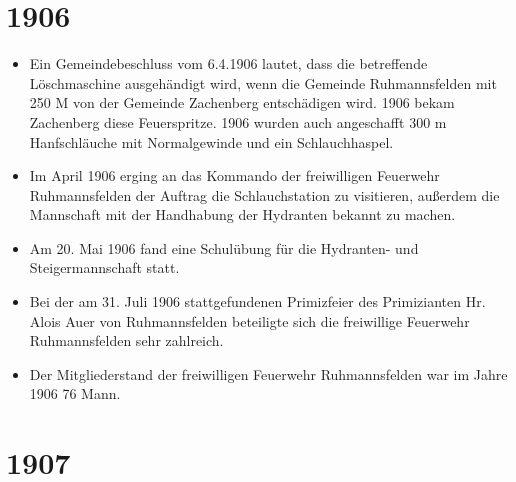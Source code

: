 \documentclass[12pt,a4paper]{book}
\begin{document}
\section*{1906}

\begin{itemize}
\item Ein Gemeindebeschluss vom 6.4.1906 lautet, dass die betreffende
Löschmaschine ausgehändigt wird, wenn die Gemeinde Ruhmannsfelden mit 250 M von
der Gemeinde Zachenberg entschädigen wird. 1906 bekam Zachenberg diese
Feuerspritze. 1906 wurden auch angeschafft 300 m Hanfschläuche mit Normalgewinde
und ein Schlauchhaspel.

\item Im April 1906 erging an das Kommando der freiwilligen Feuerwehr
Ruhmannsfelden der Auftrag die Schlauchstation zu visitieren, außerdem die
Mannschaft mit der Handhabung der Hydranten bekannt zu machen.

\item Am 20. Mai 1906 fand eine Schulübung für die Hydranten- und
Steigermannschaft statt.

\item Bei der am 31. Juli 1906 stattgefundenen Primizfeier des Primizianten Hr.
Alois Auer von Ruhmannsfelden beteiligte sich die freiwillige Feuerwehr
Ruhmannsfelden sehr zahlreich.

\item Der Mitgliederstand der freiwilligen Feuerwehr Ruhmannsfelden war im Jahre
1906 76 Mann.
\end{itemize}

\section*{1907}
\end{document}
